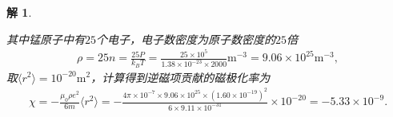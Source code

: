 \documentclass[UTF8,10pt,a4paper]{article}
\theoremstyle{Problem}
\theoremstyle{Solution}
\newtheorem*{sol}{解}
\begin{document}
\begin{sol}
\begin{enumerate}
        其中锰原子中有$25$个电子，电子数密度为原子数密度的$25$倍
        \begin{align}
            \rho=25n=\frac{25P}{k_BT}=\frac{25\times 10^5}{1.38\times 10^{-23}\times 2000}\text{m}^{-3}=9.06\times 10^{25}\text{m}^{-3},
        \end{align}
        取$\langle r^2\rangle=10^{-20}\text{m}^2$，计算得到逆磁项贡献的磁极化率为
        \begin{align}
            \chi=-\frac{\mu_0\rho e^2}{6m}\langle r^2\rangle=-\frac{4\pi\times 10^{-7}\times 9.06\times 10^{25}\times(1.60\times 10^{-19})^2}{6\times 9.11\times 10^{-31}}\times 10^{-20}=-5.33\times 10^{-9}.
        \end{align}
    \end{enumerate}
\end{sol}
\end{document}
